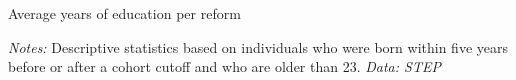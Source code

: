 \begin{table}[htbp]
	\caption{Average years of education per reform}
	\label{tab:years_educ_per_reform}
	\centering
	\begin{threeparttable}
		
		\begin{tablenotes}
			\small
			\item \textit{Notes:} Descriptive statistics based on individuals who were born within five years before or after a cohort cutoff and who are older than 23. \textit{Data: STEP}
		\end{tablenotes}
	\end{threeparttable}
\end{table}



